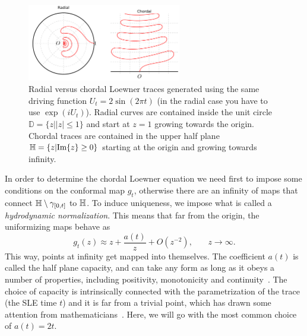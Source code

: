 \begin{figure}[t]
\begin{center}
    \includegraphics[width=0.6\textwidth]{chapters/ch4-sle/figs/radchord}
\end{center}
\caption{Radial versus chordal Loewner traces generated using the same driving
    function $U_t=2\sin(2\pi t)$ (in the radial case you have to use
    $\exp(iU_t)$). Radial curves are contained inside the unit circle
    $\mathbb{D}=\{z||z|\leq1\}$ and start at $z=1$ growing towards the origin.
    Chordal traces are contained in the upper half plane
    $\mathbb{H}=\{z|\mbox{Im}\{z\}\geq0\}$ starting at the origin and growing towards
    infinity.}
\label{fig:radchord}
\end{figure}


In order to determine the chordal Loewner equation we need first to impose some
conditions on the conformal map $g_t$, otherwise there are an infinity of maps
that connect $\mathbb{H}\setminus\gamma_{[0,t]}$ to $\mathbb{H}$. To induce uniqueness, we
impose what is called a \textit{hydrodynamic normalization}. This means that
far from the origin, the uniformizing maps behave as
\begin{equation}
    \label{eq:hydro}
    g_{t}\left(z\right)\approx
    z+\frac{a\left(t\right)}{z}+O\left(z^{-2}\right)
    ,\,\,\,\,\,\,\,\,\,\,\,
    z\rightarrow\infty.
\end{equation}
This way, points at infinity get mapped into themselves. The coefficient $a(t)$
is called the half plane capacity, and can take any form as long as it obeys a
number of properties, including positivity, monotonicity and
continuity~\cite{Kager2004}. The choice of capacity is intrinsically connected
with the parametrization of the trace (the SLE time $t$) and it is far from a
trivial point, which has drawn some attention from
mathematicians~\cite{Lawler2011}. Here, we will go with the most common choice of
$a(t)=2t$.

